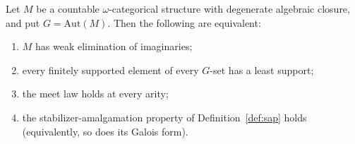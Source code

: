 \documentclass{lmcs}
\newcommand{\Aut}{\mathrm{Aut}}
\begin{document}
\begin{prop}
\label{prop:weakEI}
Let $M$ be a countable $\omega$-categorical structure with degenerate
algebraic closure, and put $G=\Aut(M)$. Then the following are
equivalent:
\begin{enumerate}[label=\textup{(\roman*)}]
\item $M$ has weak elimination of imaginaries;
\item every finitely supported element of every $G$-set has a least
support;
\item the meet law holds at every arity;
\item the stabilizer-amalgamation property of
Definition~\ref{def:sap} holds (equivalently, so does its Galois form).
\end{enumerate}
\end{prop}
\end{document}
